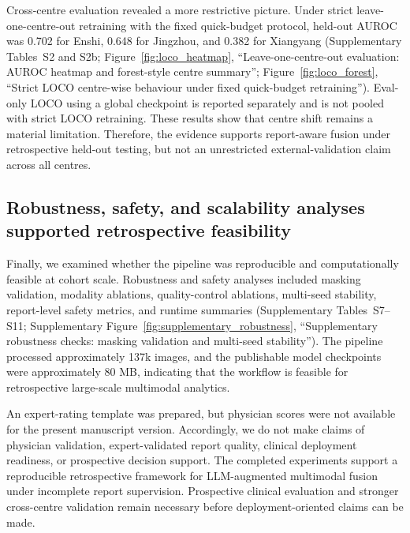 Cross-centre evaluation revealed a more restrictive picture. Under strict leave-one-centre-out retraining with the fixed quick-budget protocol, held-out AUROC was 0.702 for Enshi, 0.648 for Jingzhou, and 0.382 for Xiangyang (Supplementary Tables~S2 and S2b; Figure~\ref{fig:loco_heatmap}, ``Leave-one-centre-out evaluation: AUROC heatmap and forest-style centre summary''; Figure~\ref{fig:loco_forest}, ``Strict LOCO centre-wise behaviour under fixed quick-budget retraining''). Eval-only LOCO using a global checkpoint is reported separately and is not pooled with strict LOCO retraining. These results show that centre shift remains a material limitation. Therefore, the evidence supports report-aware fusion under retrospective held-out testing, but not an unrestricted external-validation claim across all centres.

\subsection{Robustness, safety, and scalability analyses supported retrospective feasibility}
\label{subsec:robustness_safety_scalability}

Finally, we examined whether the pipeline was reproducible and computationally feasible at cohort scale. Robustness and safety analyses included masking validation, modality ablations, quality-control ablations, multi-seed stability, report-level safety metrics, and runtime summaries (Supplementary Tables~S7--S11; Supplementary Figure~\ref{fig:supplementary_robustness}, ``Supplementary robustness checks: masking validation and multi-seed stability''). The pipeline processed approximately 137k images, and the publishable model checkpoints were approximately 80 MB, indicating that the workflow is feasible for retrospective large-scale multimodal analytics.

An expert-rating template was prepared, but physician scores were not available for the present manuscript version. Accordingly, we do not make claims of physician validation, expert-validated report quality, clinical deployment readiness, or prospective decision support. The completed experiments support a reproducible retrospective framework for LLM-augmented multimodal fusion under incomplete report supervision. Prospective clinical evaluation and stronger cross-centre validation remain necessary before deployment-oriented claims can be made.
